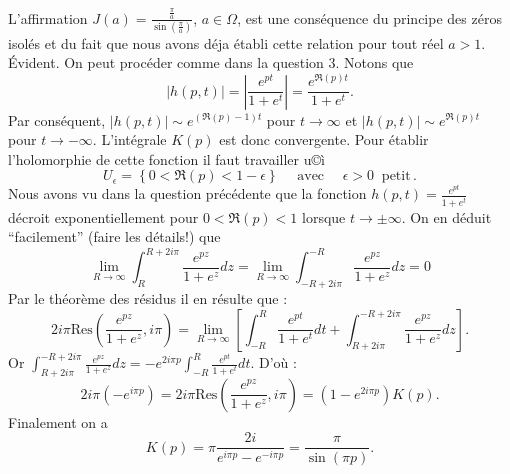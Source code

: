 {\begin{enumerate}
{L'affirmation $J(a)= \frac{\frac{\pi}{a}}{\sin\left(\frac{\pi}{a}\right)}$, $a\in \Omega$, est une cons\'equence
du principe des z\'eros isol\'es et du fait que nous avons d\'eja \'etabli cette relation pour tout r\'eel $a>1$.
\'Evident.
On peut proc\'eder comme dans la question 3. Notons que
$$|h(p,t)| =\left| \frac{e^{pt}}{1+e^t}\right|=\frac{e^{\Re (p) t}}{1+e^t}.$$
Par cons\'equent, $|h(p,t) | \sim e^{(\Re (p) -1)t}$ pour $t\to\infty$ et
$|h(p,t) | \sim e^{\Re (p) t}$ pour $t\to -\infty$. L'int\'egrale $K(p)$
est donc convergente. Pour \'etablir l'holomorphie de cette fonction il faut travailler
u©ì$$U_\epsilon =\left\{ 0< \Re (p) < 1-\epsilon \right\} \quad\text{ avec } \quad \epsilon >0 \; \; \text{petit}\, .$$
Nous avons vu dans la question pr\'ec\'edente que la fonction $h(p,t)=\frac{e^{pt}}{1+e^t}$
d\'ecroit exponentiellement pour $0< \Re (p) < 1$ lorsque $t\to \pm \infty$. On en d\'eduit
``facilement'' (faire les d\'etails!) que
$$\lim_{R\to\infty }\int_R^{R+2i\pi}\frac{e^{pz}}{1+e^z}dz = \lim_{R\to\infty }\int_{-R+2i\pi}^{-R}\frac{e^{pz}}{1+e^z}dz =0$$
Par le th\'eor\`eme des r\'esidus il en r\'esulte que :
$$2i\pi \mathrm{Res} \left(\frac{e^{pz}}{1+e^z} , i\pi \right)= \lim_{R\to\infty}
\left[ \int_{-R}^{R}\frac{e^{pt}}{1+e^t}dt+ \int_{R+2i\pi}^{-R+2i\pi}\frac{e^{pz}}{1+e^z}dz\right].$$
Or $\int_{R+2i\pi}^{-R+2i\pi}\frac{e^{pz}}{1+e^z}dz= -e^{2i\pi p}\int_{-R}^{R}\frac{e^{pt}}{1+e^t}dt$.
D'o\`u :
$$2i\pi \left( -e^{i\pi p }\right) = 2i\pi \mathrm{Res} \left(\frac{e^{pz}}{1+e^z} , i\pi \right)
=\left( 1-e^{2i\pi p}\right) K(p).$$
Finalement on a
$$K(p)=\pi \frac{2i}{e^{i\pi p}-e^{-i\pi p}} =\frac{\pi}{\sin (\pi p)}.$$
}
\end{enumerate}
}
